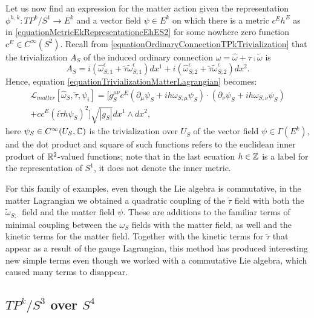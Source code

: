 Let us now find an expression for the matter action given the representation $\phi^{h,k}: TP^k/S^1 \to E^k$ and a vector field $\psi \in E^k$ on which there is a metric $c^E h^E$ as in \eqref{equationMetricEkRepresentationcEhES2} for some  nowhere zero function $c^E \in C^\infty(S^2)$. Recall from \eqref{equationOrdinaryConnectionTPkTrivialization} that the trivialization $A_S$ of the induced ordinary connection $\omega = \hat \omega + \tau \comp \tilde \omega$ is 
\begin{equation*}
    A_S = i(\hat \omega^\epsilon_{S; 1}  + \tilde \tau \tilde \omega^\epsilon_{S; 1})dx^1 + i(\hat \omega^\epsilon_{S; 2}  + \tilde \tau \tilde \omega^\epsilon_{S; 2}) dx^2.
\end{equation*}
Hence, equation \eqref{equationTrivializationMatterLagrangian} becomes:
\begin{multline}
    \mathcal L_{matter}[\hat \omega_S, \tilde \tau, \psi_i] =
    [g_S^{\mu \nu} c^E (\partial_\mu \psi_S + ih \omega_{S; \mu}  \psi_S)\cdot(\partial_\nu \psi_S + ih \omega_{S; \nu}  \psi_S) \\
    + c c^E(i \tilde \tau h \psi_S)^2] \sqrt{|g_S|}dx^1 \wedge  dx^2,
\end{multline}
here $\psi_S \in C^\infty(U_S, \mathbb{C})$ is the trivialization over $U_S$ of the vector field $\psi \in \Gamma(E^k)$, and the dot product and square of such functions refers to the euclidean inner product of $\mathbb{R}^2$-valued functions; note that in the last ecuation $h\in \mathbb{Z}$ is a label for the representation of $S^1$, it does not denote the inner metric. 

For this family of examples, even though the Lie algebra is commutative, in the matter Lagrangian we obtained a quadratic coupling of the $\tilde \tau$ field with both the $\tilde \omega_{S; \cdot}$ field and the matter field $\psi$. These are additions to the familiar terms of minimal coupling between the $\omega_S$ fields with the matter field, as well and the kinetic terms for the matter field. Together with the kinetic terms for $\tilde \tau$ that appear as a result of the gauge Lagrangian, this method has produced interesting new simple terms even though we worked with a commutative Lie algebra, which caused many terms to disappear.

\subsection{$TP^k/S^3$ over $S^4$}

